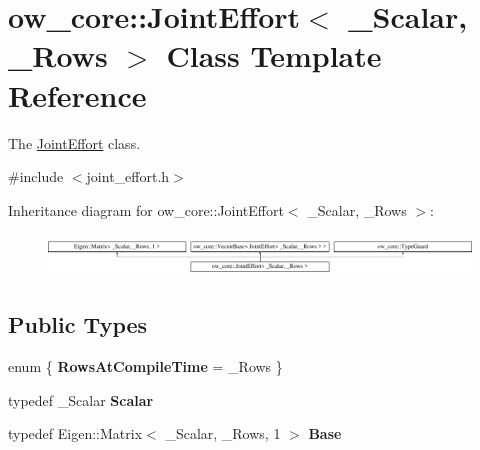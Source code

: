\hypertarget{classow__core_1_1JointEffort}{}\section{ow\+\_\+core\+:\+:Joint\+Effort$<$ \+\_\+\+Scalar, \+\_\+\+Rows $>$ Class Template Reference}
\label{classow__core_1_1JointEffort}


The \hyperlink{classow__core_1_1JointEffort}{Joint\+Effort} class.  




{\ttfamily \#include $<$joint\+\_\+effort.\+h$>$}

Inheritance diagram for ow\+\_\+core\+:\+:Joint\+Effort$<$ \+\_\+\+Scalar, \+\_\+\+Rows $>$\+:\begin{figure}[H]
\begin{center}
\leavevmode
\includegraphics[height=1.107814cm]{d5/d72/classow__core_1_1JointEffort}
\end{center}
\end{figure}
\subsection*{Public Types}
\begin{DoxyCompactItemize}
\item 
enum \{ {\bfseries Rows\+At\+Compile\+Time} = \+\_\+\+Rows
 \}\hypertarget{classow__core_1_1JointEffort_a7e72693b6f3d988ca2766b3e3aa711ad}{}\label{classow__core_1_1JointEffort_a7e72693b6f3d988ca2766b3e3aa711ad}

\item 
typedef \+\_\+\+Scalar {\bfseries Scalar}\hypertarget{classow__core_1_1JointEffort_a1576c88bb00bbb19d625a30d5ed08b52}{}\label{classow__core_1_1JointEffort_a1576c88bb00bbb19d625a30d5ed08b52}

\item 
typedef Eigen\+::\+Matrix$<$ \+\_\+\+Scalar, \+\_\+\+Rows, 1 $>$ {\bfseries Base}\hypertarget{classow__core_1_1JointEffort_a58b929b9c26c481a2c8afb907945deda}{}\label{classow__core_1_1JointEffort_a58b929b9c26c481a2c8afb907945deda}

\end{DoxyCompactItemize}
